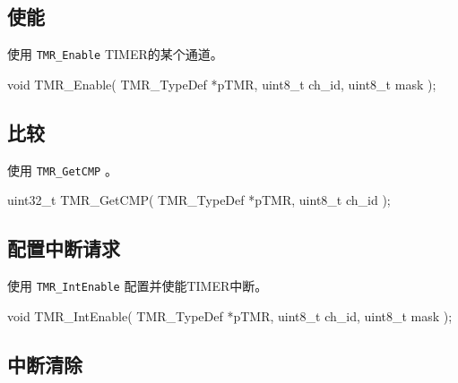 \documentclass[
  12pt,
]{book}
\newenvironment{Shaded}{\begin{snugshade}}{\end{snugshade}}
\newcommand{\DataTypeTok}[1]{\textcolor[rgb]{0.13,0.29,0.53}{#1}}
\newcommand{\NormalTok}[1]{#1}
\begin{document}
\hypertarget{ux4f7fux80fd}{%
\subsection{使能}\label{ux4f7fux80fd}}

使用 \texttt{TMR\_Enable} TIMER的某个通道。

\begin{Shaded}
\begin{Highlighting}[]
\DataTypeTok{void}\NormalTok{ TMR_Enable(}
\NormalTok{  TMR_TypeDef *pTMR, }
  \DataTypeTok{uint8_t}\NormalTok{ ch_id, }
  \DataTypeTok{uint8_t}\NormalTok{ mask}
\NormalTok{  );}
\end{Highlighting}
\end{Shaded}

\hypertarget{ux6bd4ux8f83}{%
\subsection{比较}\label{ux6bd4ux8f83}}

使用 \texttt{TMR\_GetCMP} 。

\begin{Shaded}
\begin{Highlighting}[]
\DataTypeTok{uint32_t}\NormalTok{ TMR_GetCMP(}
\NormalTok{  TMR_TypeDef *pTMR, }
  \DataTypeTok{uint8_t}\NormalTok{ ch_id}
\NormalTok{  );}
\end{Highlighting}
\end{Shaded}

\hypertarget{ux914dux7f6eux4e2dux65adux8bf7ux6c42-2}{%
\subsection{配置中断请求}\label{ux914dux7f6eux4e2dux65adux8bf7ux6c42-2}}

使用 \texttt{TMR\_IntEnable} 配置并使能TIMER中断。

\begin{Shaded}
\begin{Highlighting}[]
\DataTypeTok{void}\NormalTok{ TMR_IntEnable(}
\NormalTok{  TMR_TypeDef *pTMR, }
  \DataTypeTok{uint8_t}\NormalTok{ ch_id, }
  \DataTypeTok{uint8_t}\NormalTok{ mask}
\NormalTok{  );}
\end{Highlighting}
\end{Shaded}

\hypertarget{ux4e2dux65adux6e05ux9664}{%
\subsection{中断清除}\label{ux4e2dux65adux6e05ux9664}}
\end{document}
